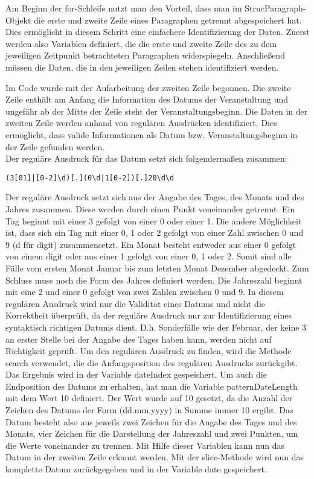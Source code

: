 {Am Beginn der for-Schleife nutzt man den Vorteil, dass man im StrucParagraph-Objekt die erste und zweite Zeile eines Paragraphen getrennt abgespeichert hat. Dies ermöglicht in diesem Schritt eine einfachere Identifizierung der Daten. Zuerst werden also Variablen definiert, die die erste und zweite Zeile des zu dem jeweiligen Zeitpunkt betrachteten Paragraphen widerspiegeln. Anschließend müssen die Daten, die in den jeweiligen Zeilen stehen identifiziert werden.

Im Code wurde mit der Aufarbeitung der zweiten Zeile begonnen. Die zweite Zeile enthält am Anfang die Information des Datums der Veranstaltung und ungefähr ab der Mitte der Zeile steht der Veranstaltungsbeginn. Die Daten in der zweiten Zeile werden anhand von regulären Ausdrücken identifiziert. Dies ermöglicht, dass valide Informationen als Datum bzw. Veranstaltungsbeginn in der Zeile gefunden werden.\\
Der reguläre Ausdruck für das Datum setzt sich folgendermaßen zusammen:
\begin{verbatim}
(3[01]|[0-2]\d)[.](0\d|1[0-2])[.]20\d\d
\end{verbatim}
Der reguläre Ausdruck setzt sich aus der Angabe des Tages, des Monats und des Jahres zusammen. Diese werden durch einen Punkt voneinander getrennt. Ein Tag beginnt mit einer 3 gefolgt von einer 0 oder einer 1. Die andere Möglichkeit ist, dass sich ein Tag mit einer 0, 1 oder 2 gefolgt von einer Zahl zwischen 0 und 9 (d für digit) zusammensetzt. Ein Monat besteht entweder aus einer 0 gefolgt von einem digit oder aus einer 1 gefolgt von einer 0, 1 oder 2. Somit sind alle Fälle vom ersten Monat Januar bis zum letzten Monat Dezember abgedeckt. Zum Schluss muss noch die Form des Jahres definiert werden. Die Jahreszahl beginnt mit eine 2 und einer 0 gefolgt von zwei Zahlen zwischen 0 und 9. 
In diesem regulären Ausdruck wird nur die Validität eines Datums und nicht die Korrektheit überprüft, da der reguläre Ausdruck nur zur Identifizierung eines syntaktisch richtigen Datums dient. D.h. Sonderfälle wie der Februar, der keine 3 an erster Stelle bei der Angabe des Tages haben kann, werden nicht auf Richtigkeit geprüft.
Um den regulären Ausdruck zu finden, wird die Methode search verwendet, die die Anfangsposition des regulären Ausdrucks zurückgibt. Das Ergebnis wird in der Variable dateIndex gespeichert. Um auch die Endposition des Datums zu erhalten, hat man die Variable patternDateLength mit dem Wert 10 definiert. Der Wert wurde auf 10 gesetzt, da die Anzahl der Zeichen des Datums der Form (dd.mm.yyyy) in Summe immer 10 ergibt. Das Datum besteht also aus jeweils zwei Zeichen für die Angabe des Tages und des Monats, vier Zeichen für die Darstellung der Jahreszahl und zwei Punkten, um die Werte voneinander zu trennen. Mit Hilfe dieser Variablen kann nun das Datum in der zweiten Zeile erkannt werden. Mit der slice-Methode wird nun das komplette Datum zurückgegeben und in der Variable date gespeichert.

}
